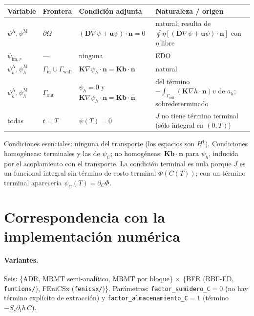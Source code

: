 \documentclass[11pt]{article}
\numberwithin{equation}{section}
\theoremstyle{remark}
\newcommand{\bu}{\mathbf{u}}
\newcommand{\bK}{\mathbf{K}}
\newcommand{\bD}{\mathbf{D}}
\newcommand{\bn}{\mathbf{n}}
\newcommand{\bb}{\mathbf{b}}
\newcommand{\im}{\mathrm{im}}
\newcommand{\pA}{\psi^{\mathrm{A}}}    %
\newcommand{\pM}{\psi^{\mathrm{M}}}    %
\newcommand{\pim}{\psi_{\im,r}}          %
\newcommand{\ph}[1]{\psi_h^{\mathrm{#1}}}  %
\newcommand{\Gin}{\Gamma_{\mathrm{in}}}
\newcommand{\Gout}{\Gamma_{\mathrm{out}}}
\newcommand{\Gwall}{\Gamma_{\mathrm{wall}}}
\begin{document}
\begin{table}[h]
\centering\small
\begin{tabular}{p{2.3cm}p{3.6cm}p{4.3cm}p{4.2cm}}
\toprule
Variable & Frontera & Condici\'on adjunta & Naturaleza / origen\\
\midrule
$\pA,\pM$ & $\partial\Omega$ & $(\bD\nabla\psi+\bu\psi)\cdot\bn=0$ & natural; resulta de $\oint\eta[(\bD\nabla\psi+\bu\psi)\cdot\bn]$ con $\eta$ libre\\
$\pim$ & --- & ninguna & EDO\\
$\ph{A},\ph{M}$ & $\Gin\cup\Gwall$ & $\bK\nabla\psi_h\cdot\bn=\bK\bb\cdot\bn$ & natural\\
$\ph{A},\ph{M}$ & $\Gout$ & $\psi_h=0$ y $\bK\nabla\psi_h\cdot\bn=\bK\bb\cdot\bn$ & del t\'ermino $-\int_{\Gout}(\bK\nabla h\cdot\bn)v$ de $a_h$; sobredeterminado\\
todas & $t=T$ & $\psi(T)=0$ & $J$ no tiene t\'ermino terminal (sólo integral en $(0,T)$)\\
\bottomrule
\end{tabular}
\end{table}
Condiciones esenciales: ninguna del transporte (los espacios son $H^1$). Condiciones homogéneas: terminales y las de $\psi_C$; no homogéneas: $\bK\bb\cdot\bn$ para $\psi_h$, inducida por el acoplamiento con el transporte. La condición terminal es nula porque $J$ es un
funcional integral sin término de costo terminal $\Phi(C(T))$; con un t\'ermino terminal aparecer\'ia $\psi_C(T)=\partial_C\Phi$.

\section{Correspondencia con la implementaci\'on num\'erica}
\label{sec:codigo}

\paragraph{Variantes.} Seis: \{ADR, MRMT semi-anal\'itico, MRMT por bloque\} $\times$ \{BFR (RBF-FD, \texttt{funtions/}), FEniCSx (\texttt{fenicsx/})\}. Par\'ametros: \texttt{factor\_sumidero\_C}$=0$ (no hay t\'ermino
expl\'icito de extracci\'on) y \texttt{factor\_almacenamiento\_C}$=1$ (t\'ermino $-S_s\partial_th\,C$).
\end{document}
